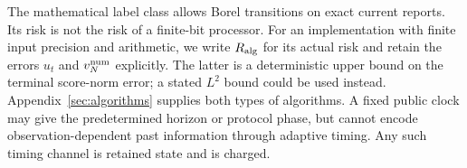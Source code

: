 The mathematical label class allows Borel transitions on exact current reports. Its risk is not the risk of a finite-bit processor. For an implementation with finite input precision and arithmetic, we write $R_{\rm alg}$ for its actual risk and retain the errors $u_t$ and $v_N^{\rm num}$ explicitly. The latter is a deterministic upper bound on the terminal score-norm error; a stated $L^2$ bound could be used instead. Appendix~\ref{sec:algorithms} supplies both types of algorithms. A fixed public clock may give the predetermined horizon or protocol phase, but cannot encode observation-dependent past information through adaptive timing. Any such timing channel is retained state and is charged.
